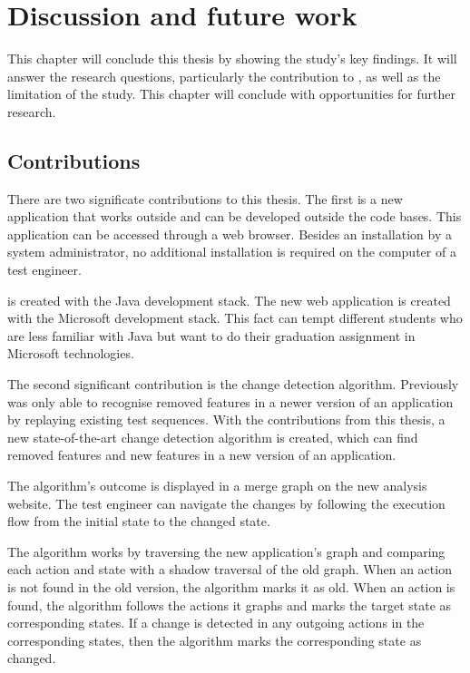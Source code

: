 \chapter{Discussion and future work} \label{chapter:disussion-conclusion-future-work}
This chapter will conclude this thesis by showing the study's key findings. It will answer the research questions, particularly the contribution to \testar, as well as the limitation of the study. This chapter will conclude with opportunities for further research. 

\section{Contributions}
There are two significate contributions to this thesis. The first is a new application that works outside and can be developed outside the \testar code bases. This application can be accessed through a web browser. Besides an installation by a system administrator, no additional installation is required on the computer of a test engineer. 

\testar is created with the Java development stack. The new web application is created with the Microsoft development stack. This fact can tempt different students who are less familiar with Java but want to do their graduation assignment in Microsoft technologies. 

The second significant contribution is the change detection algorithm. Previously \testar was only able to recognise removed features in a newer version of an application by replaying existing test sequences. With the contributions from this thesis, a new state-of-the-art change detection algorithm is created, which can find removed features and new features in a new version of an application. 

The algorithm's outcome is displayed in a merge graph on the new analysis website. The test engineer can navigate the changes by following the execution flow from the initial state to the changed state.

The algorithm works by traversing the new application's graph and comparing each action and state with a shadow traversal of the old graph. When an action is not found in the old version, the algorithm marks it as old. When an action is found, the algorithm follows the actions it graphs and marks the target state as corresponding states. If a change is detected in any outgoing actions in the corresponding states, then the algorithm marks the corresponding state as changed.

